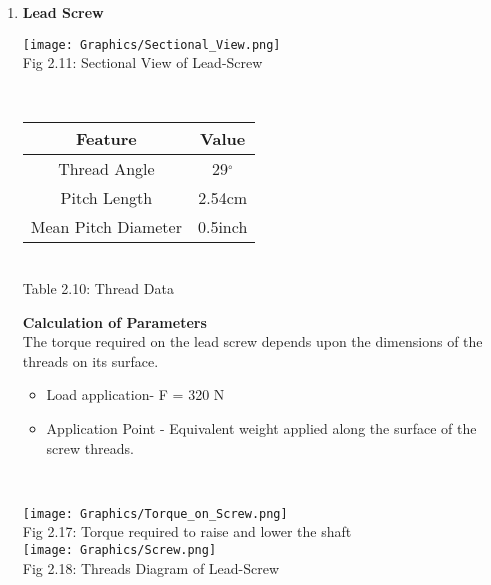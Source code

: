 \documentclass[a4,10pt]{report}
\begin{document}
\newpage
\begin{enumerate}
  
    \item \textbf{Lead Screw} \\ 
    
    \begin{center}
    \texttt{[image: Graphics/Sectional\_View.png]} \\
    \normalsize{Fig 2.11: Sectional View of Lead-Screw} \\
\end{center} \\

\vspace{5mm}

 \begin{center}
\begin{tabular}{|c|c|}
    \hline
    Feature & Value \\
    \hline
    Thread Angle & 29$^\circ$ \\
    Pitch Length & 2.54cm \\
    Mean Pitch Diameter & 0.5inch \\
    \hline
\end{tabular} \\
\normalsize{Table 2.10: Thread Data} \\
\end{center}

    
    \textbf{Calculation of Parameters} \\ The torque required on the lead screw depends upon the dimensions of the threads on its surface.
     \begin{itemize}
 \item Load application-
       F = 320 N
       

 \item Application Point - Equivalent weight applied along the surface of the screw threads.
 

\end{itemize} \\

    \begin{center}
    \texttt{[image: Graphics/Torque\_on\_Screw.png]} \\ 
    \normalsize{Fig 2.17: Torque required to raise and lower the shaft} \\
    \texttt{[image: Graphics/Screw.png]} \\
    \normalsize{Fig 2.18: Threads Diagram of Lead-Screw} \\
\end{center}
    

\end{enumerate}
\end{document}
